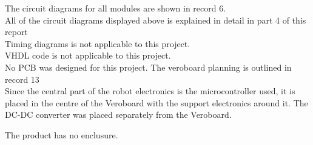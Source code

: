 The circuit diagrams for all modules are shown in record 6.\\

All of the circuit diagrams displayed above is explained in detail in part 4 of this report\\

Timing diagrams is not applicable to this project.\\

VHDL code is not applicable to this project.\\

No PCB was designed for this project. The veroboard planning is outlined in record 13\\

Since the central part of the robot electronics is the microcontroller used, it is placed in the centre of the Veroboard with the support electronics around it. The DC-DC converter was placed separately from the Veroboard.

The product has no enclusure.\\

